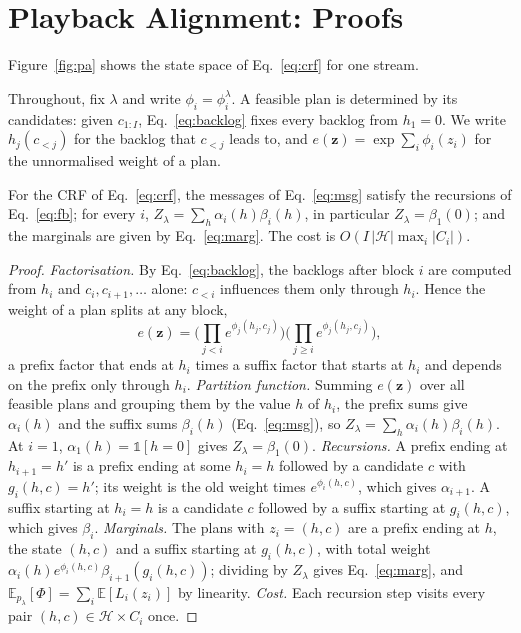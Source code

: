
\section{Playback Alignment: Proofs}
\label{app:proofs}



Figure~\ref{fig:pa} shows the state space of Eq.~\eqref{eq:crf} for one stream.

Throughout, fix $\lambda$ and write $\phi_i=\phi^\lambda_i$. A feasible plan is determined by its candidates: given
$c_{1:I}$, Eq.~\eqref{eq:backlog} fixes every backlog from $h_1=0$. We write $h_j(c_{<j})$ for the backlog that
$c_{<j}$ leads to, and $e(\bm{z})=\exp\sum_i\phi_i(z_i)$ for the unnormalised weight of a plan.

\begin{proposition}
\label{prop:fb}
For the CRF of Eq.~\eqref{eq:crf}, the messages of Eq.~\eqref{eq:msg} satisfy the recursions of Eq.~\eqref{eq:fb};
for every $i$, $Z_\lambda=\sum_h\alpha_i(h)\beta_i(h)$, in particular $Z_\lambda=\beta_1(0)$; and the marginals are given
by Eq.~\eqref{eq:marg}. The cost is $O(I\,|\mathcal{H}|\max_i|C_i|)$.
\end{proposition}

\begin{proof}
\emph{Factorisation.} By Eq.~\eqref{eq:backlog}, the backlogs after block $i$ are computed from $h_i$ and
$c_i,c_{i+1},\dots$ alone: $c_{<i}$ influences them only through $h_i$. Hence the weight of a plan splits at any block,
\[
e(\bm{z})=\Big(\textstyle\prod_{j<i}e^{\phi_j(h_j,c_j)}\Big)\Big(\textstyle\prod_{j\ge i}e^{\phi_j(h_j,c_j)}\Big),
\]
a prefix factor that ends at $h_i$ times a suffix factor that starts at $h_i$ and depends on the prefix only through
$h_i$.
\emph{Partition function.} Summing $e(\bm{z})$ over all feasible plans and grouping them by the value $h$ of $h_i$, the
prefix sums give $\alpha_i(h)$ and the suffix sums $\beta_i(h)$ (Eq.~\eqref{eq:msg}), so $Z_\lambda=\sum_h\alpha_i(h)\beta_i(h)$.
At $i=1$, $\alpha_1(h)=\mathds{1}[h=0]$ gives $Z_\lambda=\beta_1(0)$.
\emph{Recursions.} A prefix ending at $h_{i+1}=h'$ is a prefix ending at some $h_i=h$ followed by a candidate $c$ with
$g_i(h,c)=h'$; its weight is the old weight times $e^{\phi_i(h,c)}$, which gives $\alpha_{i+1}$. A suffix starting at
$h_i=h$ is a candidate $c$ followed by a suffix starting at $g_i(h,c)$, which gives $\beta_i$.
\emph{Marginals.} The plans with $z_i=(h,c)$ are a prefix ending at $h$, the state $(h,c)$ and a suffix starting at
$g_i(h,c)$, with total weight $\alpha_i(h)e^{\phi_i(h,c)}\beta_{i+1}(g_i(h,c))$; dividing by $Z_\lambda$ gives
Eq.~\eqref{eq:marg}, and $\mathbb{E}_{p_\lambda}[\Phi]=\sum_i\mathbb{E}[L_i(z_i)]$ by linearity.
\emph{Cost.} Each recursion step visits every pair $(h,c)\in\mathcal{H}\times C_i$ once.
\end{proof}

